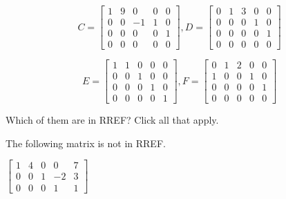 \[ 
C = \left[ \begin{array}{ccccc} 1 & 9 & 0 & 0 & 0 \\
0 & 0 & -1 & 1 & 0 \\
0 & 0 & 0 & 0 & 1 \\
0 & 0 & 0 & 0 & 0
 \end{array} \right], 

D= \left[ \begin{array}{ccccc} 0 & 1 & 3 & 0 & 0 \\
0 & 0 & 0 & 1 & 0 \\
0 & 0 & 0 & 0 & 1 \\
0 & 0 & 0 & 0 & 0 
 \end{array} \right] \]

\[ 
E = \left[ \begin{array}{ccccc} 1 & 1 & 0 & 0 & 0 \\
0 & 0 & 1 & 0 & 0 \\
0 & 0 & 0 & 1 & 0 \\
0 & 0 & 0 & 0 & 1
 \end{array} \right], 

F= \left[ \begin{array}{ccccc} 0 & 1 & 2 & 0 & 0 \\
1 & 0 & 0 & 1 & 0 \\
0 & 0 & 0 & 0 & 1 \\
0 & 0 & 0 & 0 & 0 
 \end{array} \right] \] 
 
Which of them are in RREF?  Click all that apply.  






\endedxproblem




The following matrix is not in RREF.


$\left[ \begin{array}{ccccc} 1 & 4 & 0 & 0 & 7 \\
0 & 0 & 1 & -2 & 3 \\
0 & 0 & 0 & 1 & 1
 \end{array} \right]$

